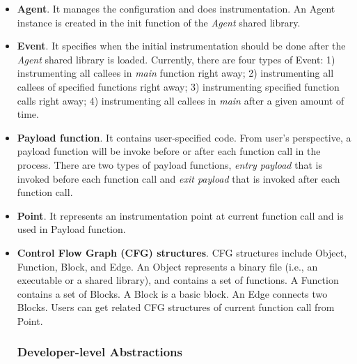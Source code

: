 \begin{itemize}
\item \textbf{Agent}. It manages the configuration and does instrumentation. An
  Agent instance is created in the init function of the {\em Agent} shared
  library.
\item \textbf{Event}. It specifies when the initial instrumentation should be
  done after the {\em Agent} shared library is loaded.  Currently, there are
  four types of Event: 1) instrumenting all callees in {\em main} function right
  away; 2) instrumenting all callees of specified functions right away; 3)
  instrumenting specified function calls right away; 4) instrumenting all
  callees in {\em main} after a given amount of time.
\item \textbf{Payload function}. It contains user-specified code.  From user's
  perspective, a payload function will be invoke before or after each function
  call in the process.  There are two types of payload functions, {\em entry
    payload} that is invoked before each function call and {\em exit payload}
  that is invoked after each function call.
\item \textbf{Point}. It represents an instrumentation point at current function
  call and is used in Payload function.
\item \textbf{Control Flow Graph (CFG) structures}. CFG structures include
  Object, Function, Block, and Edge. An Object represents a binary file (i.e.,
  an executable or a shared library), and contains a set of functions. A
  Function contains a set of Blocks. A Block is a basic block. An Edge connects
  two Blocks. Users can get related CFG structures of current function call from
  Point.

\subsubsection{Developer-level Abstractions}


\end{itemize}
